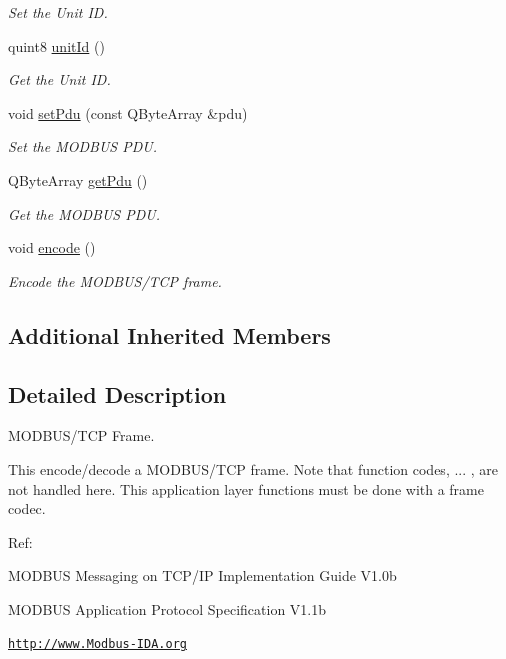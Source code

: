 \begin{DoxyCompactItemize}
\begin{DoxyCompactList}\small\item\em Set the Unit I\-D. \end{DoxyCompactList}\item 
quint8 \hyperlink{classmdt_frame_modbus_tcp_a8c2dad33c79f04fd11658ac0cefdf268}{unit\-Id} ()
\begin{DoxyCompactList}\small\item\em Get the Unit I\-D. \end{DoxyCompactList}\item 
void \hyperlink{classmdt_frame_modbus_tcp_a171095fd7a250428e4702cf9bc7620d9}{set\-Pdu} (const Q\-Byte\-Array \&pdu)
\begin{DoxyCompactList}\small\item\em Set the M\-O\-D\-B\-U\-S P\-D\-U. \end{DoxyCompactList}\item 
Q\-Byte\-Array \hyperlink{classmdt_frame_modbus_tcp_a4462aed344dcd794274a01f837a70d42}{get\-Pdu} ()
\begin{DoxyCompactList}\small\item\em Get the M\-O\-D\-B\-U\-S P\-D\-U. \end{DoxyCompactList}\item 
void \hyperlink{classmdt_frame_modbus_tcp_a59488845873981f0e2e8f2ffd544e2f4}{encode} ()
\begin{DoxyCompactList}\small\item\em Encode the M\-O\-D\-B\-U\-S/\-T\-C\-P frame. \end{DoxyCompactList}\end{DoxyCompactItemize}
\subsection*{Additional Inherited Members}


\subsection{Detailed Description}
M\-O\-D\-B\-U\-S/\-T\-C\-P Frame. 

This encode/decode a M\-O\-D\-B\-U\-S/\-T\-C\-P frame. Note that function codes, ... , are not handled here. This application layer functions must be done with a frame codec.

Ref\-:
\begin{DoxyItemize}
\item M\-O\-D\-B\-U\-S Messaging on T\-C\-P/\-I\-P Implementation Guide V1.\-0b
\item M\-O\-D\-B\-U\-S Application Protocol Specification V1.\-1b
\item \href{http://www.Modbus-IDA.org}{\tt http\-://www.\-Modbus-\/\-I\-D\-A.\-org} 
\end{DoxyItemize}

